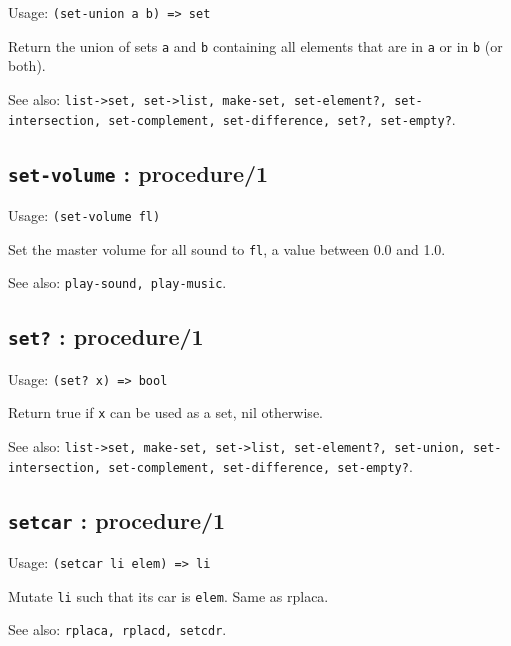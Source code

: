 \documentclass[
]{article}
\newcommand{\passthrough}[1]{#1}
\begin{document}
Usage: \passthrough{\lstinline!(set-union a b) => set!}

Return the union of sets \passthrough{\lstinline!a!} and
\passthrough{\lstinline!b!} containing all elements that are in
\passthrough{\lstinline!a!} or in \passthrough{\lstinline!b!} (or both).

See also:
\passthrough{\lstinline!list->set, set->list, make-set, set-element?, set-intersection, set-complement, set-difference, set?, set-empty?!}.

\hypertarget{set-volume-procedure1-1}{%
\subsection{\texorpdfstring{\texttt{set-volume} :
procedure/1}{set-volume : procedure/1}}\label{set-volume-procedure1-1}}

Usage: \passthrough{\lstinline!(set-volume fl)!}

Set the master volume for all sound to \passthrough{\lstinline!fl!}, a
value between 0.0 and 1.0.

See also: \passthrough{\lstinline!play-sound, play-music!}.

\hypertarget{set-procedure1-1}{%
\subsection{\texorpdfstring{\texttt{set?} :
procedure/1}{set? : procedure/1}}\label{set-procedure1-1}}

Usage: \passthrough{\lstinline!(set? x) => bool!}

Return true if \passthrough{\lstinline!x!} can be used as a set, nil
otherwise.

See also:
\passthrough{\lstinline!list->set, make-set, set->list, set-element?, set-union, set-intersection, set-complement, set-difference, set-empty?!}.

\hypertarget{setcar-procedure1-1}{%
\subsection{\texorpdfstring{\texttt{setcar} :
procedure/1}{setcar : procedure/1}}\label{setcar-procedure1-1}}

Usage: \passthrough{\lstinline!(setcar li elem) => li!}

Mutate \passthrough{\lstinline!li!} such that its car is
\passthrough{\lstinline!elem!}. Same as rplaca.

See also: \passthrough{\lstinline!rplaca, rplacd, setcdr!}.
\end{document}
